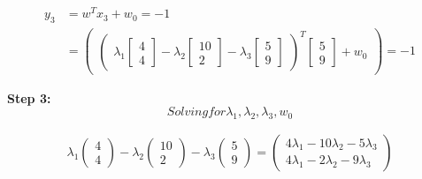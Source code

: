 \documentclass[12pt]{report}
\begin{document}
\begin{equation*}
	\begin{aligned}
		y_{3} & =  w^T x_{3} + w_{0} = -1           \\
		      & = \begin{pmatrix}
			          \begin{pmatrix}
				\lambda_{1}\begin{bmatrix}
					           4 \\
					           4
				           \end{bmatrix} -

				\lambda_{2}\begin{bmatrix}
					           10 \\
					           2
				           \end{bmatrix}
				-

				\lambda_{3}\begin{bmatrix}
					           5 \\
					           9
				           \end{bmatrix}\end{pmatrix}  ^ T
			          \begin{bmatrix}
				5 \\
				9
			\end{bmatrix} + w_{0}
		          \end{pmatrix} = -1
	\end{aligned}
\end{equation*}

\textbf{Step 3:}
\begin{equation*}
	Solving for \lambda_{1}, \lambda_{2}, \lambda_{3}, w_{0}
\end{equation*}


\begin{equation*}
	\begin{aligned}
		\lambda_{1}\begin{pmatrix}4 \\ 4\end{pmatrix}-\lambda_{2}\begin{pmatrix}10\\ 2\end{pmatrix}-\lambda_{3}\begin{pmatrix}5\\ 9\end{pmatrix}=\begin{pmatrix}4\lambda_{1}-10\lambda_{2}-5\lambda_{3}\\ 4\lambda_{1}-2\lambda_{2}-9\lambda_{3}\end{pmatrix}
	\end{aligned}
\end{equation*}
\end{document}
